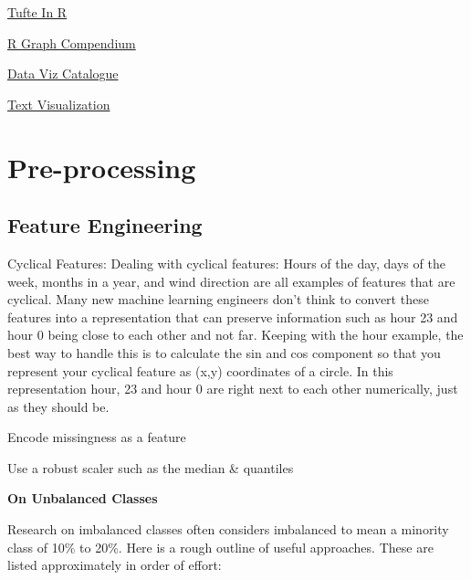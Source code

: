 \documentclass[]{book}
\begin{document}
\href{http://motioninsocial.com/tufte/}{Tufte In R}

\href{http://shinyapps.org/apps/RGraphCompendium/index.php}{R Graph Compendium}

\href{http://www.datavizcatalogue.com/index.html}{Data Viz Catalogue}

\href{http://textvis.lnu.se/}{Text Visualization}

\hypertarget{pre-processing}{%
\section{Pre-processing}\label{pre-processing}}

\hypertarget{feature-engineering}{%
\subsection{Feature Engineering}\label{feature-engineering}}

Cyclical Features: Dealing with cyclical features: Hours of the day, days of the week, months in a year, and wind direction are all examples of features that are cyclical. Many new machine learning engineers don't think to convert these features into a representation that can preserve information such as hour 23 and hour 0 being close to each other and not far. Keeping with the hour example, the best way to handle this is to calculate the sin and cos component so that you represent your cyclical feature as (x,y) coordinates of a circle. In this representation hour, 23 and hour 0 are right next to each other numerically, just as they should be.

Encode missingness as a feature

Use a robust scaler such as the median \& quantiles

\textbf{On Unbalanced Classes}

Research on imbalanced classes often considers imbalanced to mean a minority class of 10\% to 20\%. Here is a rough outline of useful approaches. These are listed approximately in order of effort:
\end{document}
